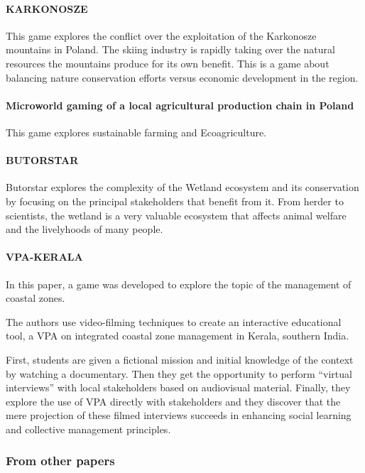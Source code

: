 \paragraph{KARKONOSZE
\cite{Krolikowska2007}}
This game explores the conflict over the exploitation of the Karkonosze mountains
in Poland. The skiing industry is rapidly taking over the natural resources
the mountains produce for its own benefit. This is a game about balancing
nature conservation efforts versus economic development in the region.

\paragraph{Microworld gaming of a local agricultural production chain in Poland
\cite{Martin2007}}
This game explores sustainable farming and Ecoagriculture.

\paragraph{BUTORSTAR
\cite{Mathevet2007}}
Butorstar explores the complexity of the Wetland ecosystem and its conservation
by focusing on the principal stakeholders that benefit from it. From herder to
scientists, the wetland is a very valuable ecosystem that affects animal
welfare and the livelyhoods of many people.

\paragraph{VPA-KERALA
\cite{Witteveen2007}}
In this paper, a game was developed to explore the topic of the management
of coastal zones.

The authors use video-filming techniques to create an interactive educational
tool, a \gls{VPA} on integrated coastal zone management in Kerala, southern
India.

First, students are given a fictional mission
and initial knowledge of the context by watching a documentary. Then they get the
opportunity to perform “virtual interviews” with local stakeholders based on 
audiovisual material. Finally, they explore the use of \gls{VPA}
directly with stakeholders and they discover that the mere projection
of these filmed interviews succeeds in enhancing social learning and
collective management principles.

\subsubsection{From other papers}

